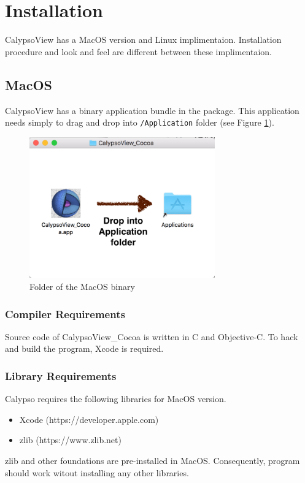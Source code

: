 \newpage
\section{Installation}
CalypsoView has a MacOS version and Linux implimentaion. Installation procedure and look and feel are different between these implimentaion.

\subsection{MacOS}
CalypsoView has a binary application bundle in the package. This application needs simply to drag and drop into  
\verb|/Application| folder (see Figure \ref{fig:mac_install}).
%
\begin{figure}[htbp]
\begin{center}
\includegraphics*[width=80mm]{images/install_mac}
\end{center}
\caption{Folder of the MacOS binary}
\label{fig:mac_install}
\end{figure}
%

\subsubsection{Compiler Requirements}
Source code of CalypsoView\_Cocoa is written in C and Objective-C. To hack and build the program, Xcode is required.

\subsubsection{Library Requirements}
\label{sec:requirements_mac}
Calypso requires the following libraries for MacOS version.
\begin{itemize}
\item Xcode (https://developer.apple.com)
\item zlib (https://www.zlib.net)
\end{itemize}
zlib and other foundations are pre-installed in MacOS. Consequently, program should work witout installing any other libraries.

